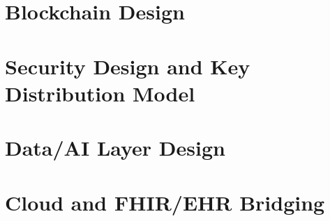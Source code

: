 \documentclass[12pt]{article}
\begin{document}
\section{Blockchain Design}





\section{Security Design and Key Distribution Model}





\section{Data/AI Layer Design}




\section{Cloud and FHIR/EHR Bridging}
\end{document}
